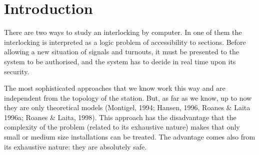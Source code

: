 \documentclass{article}
\begin{document}
\begin{abstract}
An expert system devoted to the design of routes in a railway interlocking is
presented in this article. It is able to extract knowledge from the given data
(propose new routes and give information about them: number of sections, estimated
time) and to verify the safety of proposed new route (interlocking). It takes
advantage of the the powerful handling of lists provided by the computer algebra
system Maple 6.

Once the topology of the network is introduced, the user can ask the expert system
to exhaustively determine all routes departing from a given section and also all
routes that are extension of a given one.  In both cases it is possible to ask the
system to return only those routes that end in a given goal section. The system
orders the routes accordingly to their length (in number of sections). Moreover,
if an approximated time is associated to each section (these times can be
calculated taken into consideration their physical length, speed limitations...),
the system can return the theoretical time corresponding to each possible route.
Therefore it is possible to optimise the selection of the route w.r.t. different
criteria. 

Finally, the verification of the proposal, i.e. the compatibility of routes (the
task of the interlocking system) is trivial with this data structure: it is enough 
to check that every pair of routes (of the routes to be authorised at the same time)
don't share any common section.

\end{abstract}

   
\section{Introduction}

There are two ways to study an interlocking by computer.  In one of them the
interlocking is interpreted as a logic problem of accessibility to sections.
Before allowing a new situation of signals and turnouts, it must be presented to
the system to be authorised, and the system has to decide in real time upon its
security.

The most sophisticated approaches that we know work this way and 
are independent from the topology of the station. But, as far as we know, up to now they 
are only theoretical models (Montigel, 1994; Hansen, 1996, Roanes \& Laita 1996a; 
Roanes \& Laita, 1998). This approach has the disadvantage that the complexity of the 
problem (related to its exhaustive nature) makes that only small or medium size 
installations can be treated. The advantage comes also from its exhaustive nature: they 
are absolutely safe. 
\end{document}
